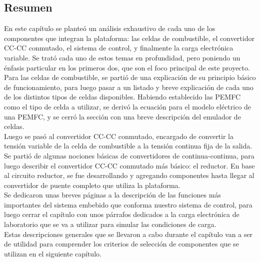 \subsection{Resumen}

En este capítulo se planteó un análisis exhaustivo de cada uno de los componentes que integran la plataforma: las celdas de combustible, el convertidor CC-CC conmutado, el sistema de control, y finalmente la carga electrónica variable. Se trató cada uno de estos temas en profundidad, pero poniendo un énfasis particular en los primeros dos, que son el foco principal de este proyecto.\\

Para las celdas de combustible, se partió de una explicación de su principio básico de funcionamiento, para luego pasar a un listado y breve explicación de cada uno de los distintos tipos de celdas disponibles. Habiendo establecido las PEMFC como el tipo de celda a utilizar, se derivó la ecuación para el modelo eléctrico de una PEMFC, y se cerró la sección con una breve descripción del emulador de celdas.\\

Luego se pasó al convertidor CC-CC conmutado, encargado de convertir la tensión variable de la celda de combustible a la tensión continua fija de la salida. Se partió de algunas nociones básicas de convertidores de continua-continua, para luego describir el convertidor CC-CC conmutado más básico: el reductor. En base al circuito reductor, se fue desarrollando y agregando componentes hasta llegar al convertidor de puente completo que utiliza la plataforma.\\

Se dedicaron unas breves páginas a la descripción de las funciones más importantes del sistema embebido que conforma nuestro sistema de control, para luego cerrar el capítulo con unos párrafos dedicados a la carga electrónica de laboratorio que se va a utilizar para simular las condiciones de carga.\\

Estas descripciones generales que se llevaron a cabo durante el capítulo van a ser de utilidad para comprender los criterios de selección de componentes que se utilizan en el siguiente capítulo.\\